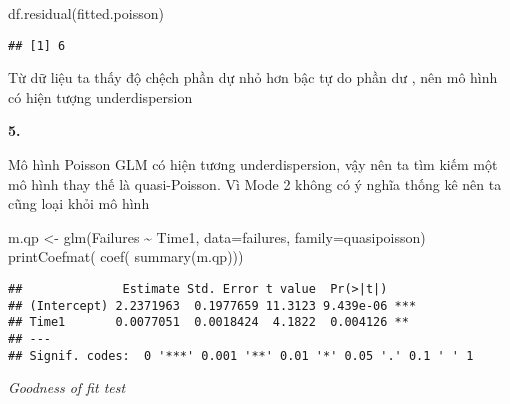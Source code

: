 \documentclass[
]{article}
\newenvironment{Shaded}{\begin{snugshade}}{\end{snugshade}}
\newcommand{\AttributeTok}[1]{\textcolor[rgb]{0.77,0.63,0.00}{#1}}
\newcommand{\FunctionTok}[1]{\textcolor[rgb]{0.00,0.00,0.00}{#1}}
\newcommand{\NormalTok}[1]{#1}
\newcommand{\OtherTok}[1]{\textcolor[rgb]{0.56,0.35,0.01}{#1}}
\newcommand{\SpecialCharTok}[1]{\textcolor[rgb]{0.00,0.00,0.00}{#1}}
\begin{document}
\begin{Shaded}
\begin{Highlighting}[]
\FunctionTok{df.residual}\NormalTok{(fitted.poisson)}
\end{Highlighting}
\end{Shaded}

\begin{verbatim}
## [1] 6
\end{verbatim}

Từ dữ liệu ta thấy độ chệch phần dự nhỏ hơn bậc tự do phần dư , nên mô
hình có hiện tượng underdispersion

\textbf{5.}

Mô hình Poisson GLM có hiện tương underdispersion, vậy nên ta tìm kiếm
một mô hình thay thế là quasi-Poisson. Vì Mode 2 không có ý nghĩa thống
kê nên ta cũng loại khỏi mô hình

\begin{Shaded}
\begin{Highlighting}[]
\NormalTok{m.qp }\OtherTok{\textless{}{-}} \FunctionTok{glm}\NormalTok{(Failures }\SpecialCharTok{\textasciitilde{}}\NormalTok{ Time1, }\AttributeTok{data=}\NormalTok{failures, }\AttributeTok{family=}\NormalTok{quasipoisson)}
\FunctionTok{printCoefmat}\NormalTok{( }\FunctionTok{coef}\NormalTok{( }\FunctionTok{summary}\NormalTok{(m.qp)))}
\end{Highlighting}
\end{Shaded}

\begin{verbatim}
##              Estimate Std. Error t value  Pr(>|t|)    
## (Intercept) 2.2371963  0.1977659 11.3123 9.439e-06 ***
## Time1       0.0077051  0.0018424  4.1822  0.004126 ** 
## ---
## Signif. codes:  0 '***' 0.001 '**' 0.01 '*' 0.05 '.' 0.1 ' ' 1
\end{verbatim}

\emph{Goodness of fit test }
\end{document}
